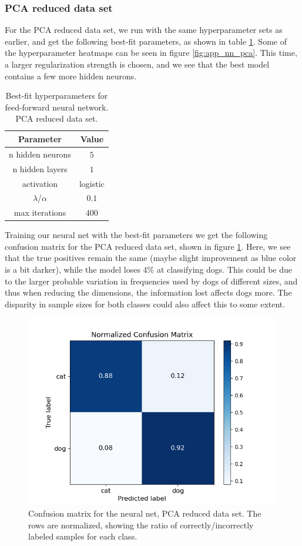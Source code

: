 \documentclass[a4paper]{article}
\begin{document}
\subsubsection{PCA reduced data set}
For the PCA reduced data set, we run with the same hyperparameter sets as earlier, and get the following best-fit parameters, as shown in table \ref{tab:best_fit_nn_pca}. Some of the hyperparameter heatmaps can be seen in figure \ref{fig:app_nn_pca}. This time, a larger regularization strength is chosen, and we see that the best model contains a few more hidden neurons.
\begin{table}[H]
  \centering
  \caption{Best-fit hyperparameters for feed-forward neural network. PCA reduced data set.}
  \label{tab:best_fit_nn_pca}
  \begin{tabular}{c|c}
    \hline\hline
    Parameter & Value\\\hline
    n hidden neurons &  $5$\\
    n hidden layers &  $1$\\
    activation & logistic \\
    $\lambda$/$\alpha$  & $0.1$\\
    max iterations & $400$
    \end{tabular}
\end{table}
Training our neural net with the best-fit parameters we get the following confusion matrix for the PCA reduced data set, shown in figure \ref{fig:nn_confusion_pca}. Here, we see that the true positives remain the same (maybe slight improvement as blue color is a bit darker), while the model loses 4\% at classifying dogs. This could be due to the larger probable variation in frequencies used by dogs of different sizes, and thus when reducing the dimensions, the information lost affects dogs more. The disparity in sample sizes for both classes could also affect this to some extent.
\begin{figure}[H]
	\centering
	\includegraphics[scale=0.7]{../figures/neural_net/confusion_matrix_nbins200_pca35_seed4155_ts0.20.png}
	\caption{Confusion matrix for the neural net, PCA reduced data set. The rows are normalized, showing the ratio of correctly/incorrectly labeled samples for each class.}
	\label{fig:nn_confusion_pca}
\end{figure}	
\end{document}
